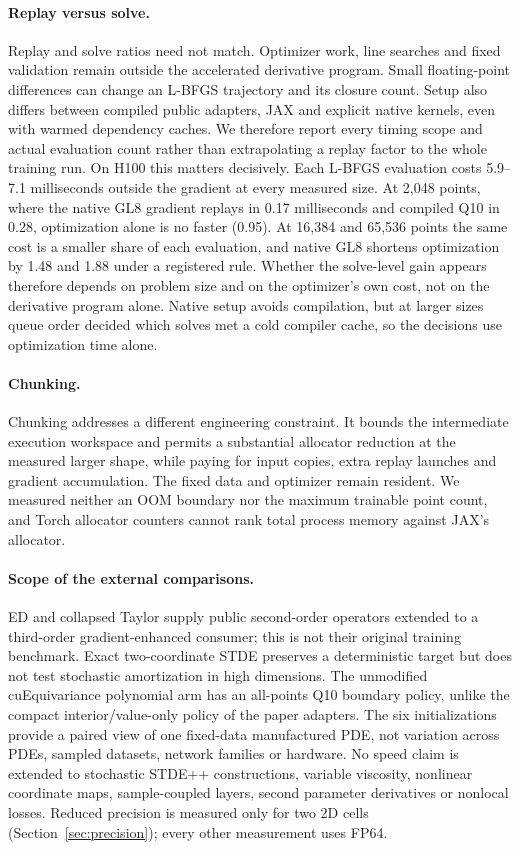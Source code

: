 \documentclass[11pt]{article}
\begin{document}
\paragraph{Replay versus solve.}
Replay and solve ratios need not match. Optimizer work, line searches and
fixed validation remain outside the accelerated derivative program. Small
floating-point differences can change an L-BFGS trajectory and its closure
count. Setup also differs between compiled public adapters, JAX and explicit
native kernels, even with warmed dependency caches. We therefore report
every timing scope and actual evaluation count rather than extrapolating a
replay factor to the whole training run. On H100 this matters
decisively. Each L-BFGS evaluation costs 5.9--7.1 milliseconds outside the
gradient at every measured size. At 2,048 points, where the native GL8
gradient replays in 0.17 milliseconds and compiled Q10 in 0.28,
optimization alone is no faster (0.95). At 16,384 and 65,536 points the
same cost is a smaller share of each evaluation, and native GL8 shortens
optimization by 1.48 and 1.88 under a registered rule. Whether the
solve-level gain appears therefore depends on problem size and on the
optimizer's own cost, not on the derivative program alone. Native setup
avoids compilation, but at larger sizes queue order decided which solves
met a cold compiler cache, so the decisions use optimization time alone.

\paragraph{Chunking.}
Chunking addresses a different engineering constraint. It bounds the
intermediate execution workspace and permits a substantial allocator
reduction at the measured larger shape, while paying for input copies,
extra replay launches and gradient accumulation. The fixed data and
optimizer remain resident. We measured neither an OOM boundary nor the
maximum trainable point count, and Torch allocator counters cannot rank
total process memory against JAX's allocator.

\paragraph{Scope of the external comparisons.}
ED and collapsed Taylor supply public second-order operators extended to a
third-order gradient-enhanced consumer; this is not their original training
benchmark. Exact two-coordinate STDE preserves a deterministic target but
does not test stochastic amortization in high dimensions. The unmodified
cuEquivariance polynomial arm has an all-points Q10 boundary policy, unlike
the compact interior/value-only policy of the paper adapters. The six
initializations provide a paired view of one fixed-data manufactured PDE,
not variation across PDEs, sampled datasets, network families or hardware.
No speed claim is extended to stochastic STDE++ constructions, variable
viscosity, nonlinear coordinate maps, sample-coupled layers, second
parameter derivatives or nonlocal losses. Reduced precision is measured
only for two 2D cells (Section~\ref{sec:precision}); every other
measurement uses FP64.
\end{document}
